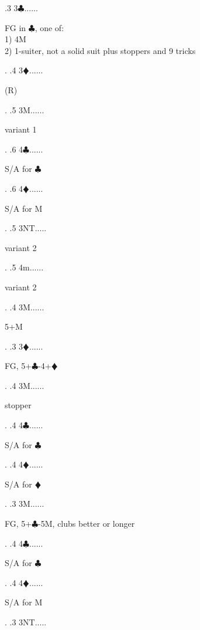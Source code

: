\documentclass[a4paper]{article}
\newcommand{\BC}{\textcolor{OliveGreen}{$\clubsuit$}}
\newcommand{\BD}{\textcolor{RedOrange}{$\vardiamondsuit$}}
\begin{document}
{ .3 3\BC......\begin{minipage}[t]{0.8\textwidth}
FG in \BC , one of:\\
1) 4M\\
2) 1-suiter, not a solid suit plus stoppers and 9 tricks
\end{minipage}. 
 .4 3\BD......\begin{minipage}[t]{0.8\textwidth}
(R)
\end{minipage}. 
 .5 3M......\begin{minipage}[t]{0.8\textwidth}
variant 1
\end{minipage}. 
 .6 4\BC......\begin{minipage}[t]{0.8\textwidth}
S/A for \BC 
\end{minipage}. 
 .6 4\BD......\begin{minipage}[t]{0.8\textwidth}
S/A for M
\end{minipage}. 
 .5 3NT.....\begin{minipage}[t]{0.8\textwidth}
variant 2
\end{minipage}. 
 .5 4m......\begin{minipage}[t]{0.8\textwidth}
variant 2
\end{minipage}. 
 .4 3M......\begin{minipage}[t]{0.8\textwidth}
5+M
\end{minipage}. 
 .3 3\BD......\begin{minipage}[t]{0.8\textwidth}
FG, 5+\BC -4+\BD 
\end{minipage}. 
 .4 3M......\begin{minipage}[t]{0.8\textwidth}
stopper
\end{minipage}. 
 .4 4\BC......\begin{minipage}[t]{0.8\textwidth}
S/A for \BC 
\end{minipage}. 
 .4 4\BD......\begin{minipage}[t]{0.8\textwidth}
S/A for \BD 
\end{minipage}. 
 .3 3M......\begin{minipage}[t]{0.8\textwidth}
FG, 5+\BC -5M, clubs better or longer
\end{minipage}. 
 .4 4\BC......\begin{minipage}[t]{0.8\textwidth}
S/A for \BC 
\end{minipage}. 
 .4 4\BD......\begin{minipage}[t]{0.8\textwidth}
S/A for M
\end{minipage}. 
 .3 3NT.....\begin{minipage}[t]{0.8\textwidth}

\end{minipage}}
\end{document}
